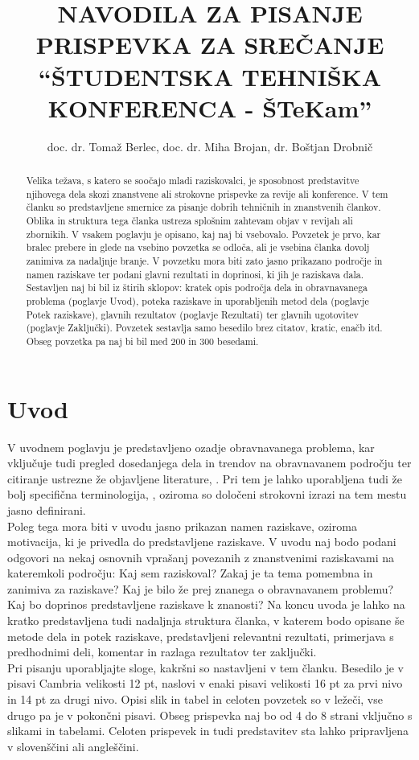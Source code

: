 \documentclass[12pt,a4paper,oneside,fleqn]{article}
\title{NAVODILA ZA PISANJE PRISPEVKA ZA SREČANJE “ŠTUDENTSKA  TEHNIŠKA KONFERENCA - ŠTeKam”}
\author{doc. dr. Tomaž Berlec, doc. dr. Miha Brojan, dr. Boštjan Drobnič}
\begin{document}
\pagestyle{plain}
\maketitle

\begin{abstract}
Velika težava, s katero se soočajo mladi raziskovalci, je sposobnost predstavitve njihovega dela skozi znanstvene ali strokovne prispevke za revije ali konference. V tem članku so predstavljene smernice za pisanje dobrih tehničnih in znanstvenih člankov. Oblika in struktura tega članka ustreza splošnim zahtevam objav v revijah ali zbornikih. V vsakem poglavju je opisano, kaj naj bi vsebovalo. Povzetek je prvo, kar bralec prebere in glede na vsebino povzetka se odloča, ali je vsebina članka dovolj zanimiva za nadaljnje branje. V povzetku mora biti zato jasno prikazano področje in namen raziskave ter podani glavni rezultati in doprinosi, ki jih je raziskava dala. Sestavljen naj bi bil iz štirih sklopov: kratek opis področja dela in obravnavanega problema (poglavje Uvod), poteka raziskave in uporabljenih metod dela (poglavje Potek raziskave), glavnih rezultatov (poglavje Rezultati) ter glavnih ugotovitev (poglavje Zaključki). Povzetek sestavlja samo besedilo brez citatov, kratic, enačb itd. Obseg povzetka pa naj bi bil med 200 in 300 besedami.
\end{abstract}


\section{Uvod}
V uvodnem poglavju je predstavljeno ozadje obravnavanega problema, kar vključuje tudi pregled dosedanjega dela in trendov na obravnavanem področju ter citiranje ustrezne že objavljene literature, \cite{kehlhofer_2009}. Pri tem je lahko uporabljena tudi že bolj specifična terminologija, \cite{kizuka_2009}, oziroma so določeni strokovni izrazi na tem mestu jasno definirani.\\
Poleg tega mora biti v uvodu jasno prikazan namen raziskave, oziroma motivacija, ki je privedla do predstavljene raziskave. V uvodu naj bodo podani odgovori na nekaj osnovnih vprašanj povezanih z znanstvenimi raziskavami na kateremkoli področju: Kaj sem raziskoval? Zakaj je ta tema pomembna in zanimiva za raziskave? Kaj je bilo že prej znanega o obravnavanem problemu? Kaj bo doprinos predstavljene raziskave k znanosti?
Na koncu uvoda je lahko na kratko predstavljena tudi nadaljnja struktura članka, v katerem bodo opisane še metode dela in potek raziskave, predstavljeni relevantni rezultati, primerjava s predhodnimi deli, komentar in razlaga rezultatov ter zaključki.\\
Pri pisanju uporabljajte sloge, kakršni so nastavljeni v tem članku. Besedilo je v pisavi Cambria velikosti 12 pt, naslovi v enaki pisavi velikosti 16 pt za prvi nivo in 14 pt za drugi nivo. Opisi slik in tabel in celoten povzetek so v ležeči, vse drugo pa je v pokončni pisavi. Obseg prispevka naj bo od 4 do 8 strani vključno s slikami in tabelami. Celoten prispevek in tudi predstavitev sta lahko pripravljena v slovenščini ali angleščini.
\end{document}
